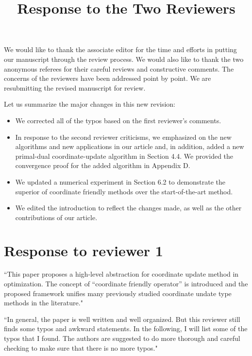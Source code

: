 \documentclass[amsa]{ipart}
\begin{document}
\title{Response to the Two Reviewers}
\vspace{5mm}

We would like to thank the associate editor for the time and efforts in putting our manuscript through the review process. We would also like to thank the two anonymous referees for their careful reviews and constructive comments. The concerns of the reviewers have been addressed point by point. We are resubmitting the revised manuscript for review. 

Let us summarize the major changes in this new revision:
\begin{itemize}
\item We corrected all of the typos based on the first reviewer's comments. 
\item In response to the second reviewer criticisms, we emphasized on the new algorithms and new applications  in our article and, in addition,  added a new primal-dual coordinate-update algorithm in Section 4.4. We provided the convergence proof for the added algorithm   in Appendix D.
\item We updated a  numerical experiment in Section 6.2 to demonstrate the superior of coordinate friendly methods over the start-of-the-art method. 
\item We edited the introduction to reflect the changes made, as well as the other contributions of our article.
\end{itemize}

\section{Response to reviewer 1}
``This paper proposes a high-level abstraction for coordinate update method in optimization. The concept of ``coordinate friendly operator'' is introduced and the proposed framework unifies many previously studied coordinate undate type methods in the literature."

``In general, the paper is well written and well organized. But this reviewer still finds some typos and awkward statements. In the following, I will list some of the typos that I found. The authors are suggested to do more thorough and careful checking to make sure that there is no more typos."

\end{document}
